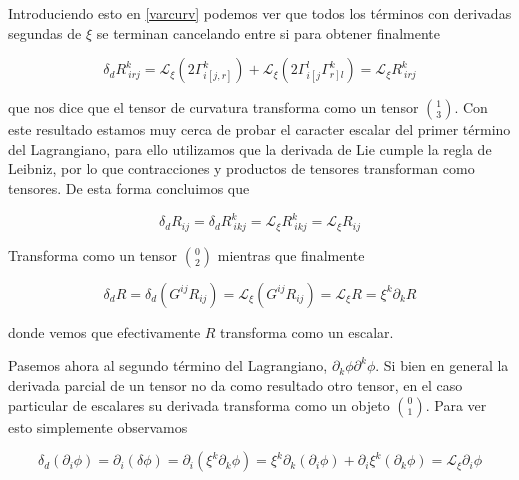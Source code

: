 \documentclass{article}
\numberwithin{equation}{section}
\begin{document}
Introduciendo esto en \ref{varcurv} podemos ver que todos los términos con derivadas segundas de $ \xi $ se terminan cancelando entre si para obtener finalmente

\begin{equation*}
\delta_d R^{k}_{ \ i r j} = \mathcal{L}_{\xi} \left( 2 \Gamma^{k}_{i \left[j , r\right] } \right) + \mathcal{L}_{\xi} \left(2\Gamma^l_{i\left[ j \right.}\Gamma^{k}_{ \left. r \right] l}\right) = \mathcal{L}_{\xi} R^{k}_{ \ i r j}
\end{equation*}

que nos dice que el tensor de curvatura transforma como un tensor $ \binom{1}{3} $. Con este resultado estamos muy cerca de probar el caracter escalar del primer término del Lagrangiano, para ello utilizamos que la derivada de Lie cumple la regla de Leibniz, por lo que contracciones y productos de tensores transforman como tensores. De esta forma concluimos que

\begin{equation*}
\delta_d R_{i j} = \delta_d R^{k}_{ \ i k j} = \mathcal{L}_{\xi} R^{k}_{ \ i k j} = \mathcal{L}_{\xi} R_{i j} 
\end{equation*} 

Transforma como un tensor $ \binom{0}{2} $ mientras que finalmente

\vspace{0.4cm}

\begin{boxquation}
	\begin{equation}\label{res3}
	\delta_d R = \delta_d \left( G^{i j }R_{i j }\right) = \mathcal{L}_{\xi} \left( G^{i j }R_{i j }\right) = \mathcal{L}_{\xi} R = \xi^k \partial_k R 
	\end{equation}
\end{boxquation}

donde vemos que efectivamente $ R $ transforma como un escalar.\\

\vspace{0.4cm}


Pasemos ahora al segundo término del Lagrangiano, $ \partial_k \phi\partial^k \phi $. Si bien en general la derivada parcial de un tensor no da como resultado otro tensor, en el caso particular de escalares su derivada transforma como un objeto $ \binom{0}{1} $. Para ver esto simplemente observamos 

\begin{equation*}
\delta_d \left( \partial_i \phi \right) = \partial_i \left(\delta \phi\right) = \partial_i\left(\xi^k \partial_k \phi\right) = \xi^k \partial_k \left(\partial_i \phi \right) + \partial_i \xi^k \left(\partial_k \phi\right) = \mathcal{L}_{\xi} \partial_i \phi
\end{equation*}
\end{document}
